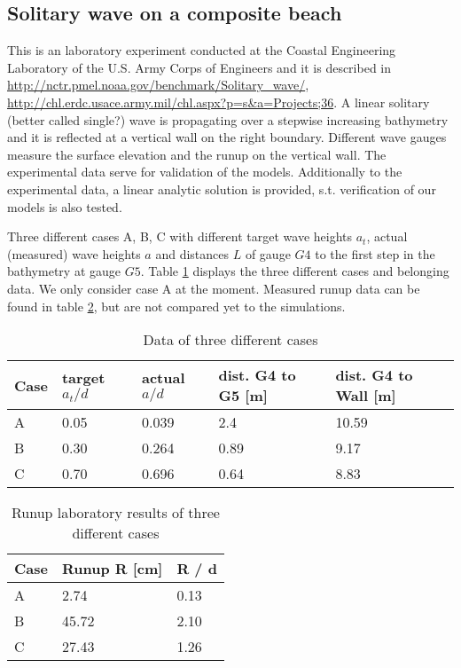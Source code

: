 \subsection{Solitary wave on a composite beach}
This is an laboratory experiment conducted at the Coastal Engineering Laboratory of the U.S. Army Corps of Engineers and it is described in \url{http://nctr.pmel.noaa.gov/benchmark/Solitary_wave/}, \url{http://chl.erdc.usace.army.mil/chl.aspx?p=s&a=Projects;36}. 
A linear solitary (better called single?) wave is propagating over a stepwise increasing bathymetry and it is reflected at a vertical wall on the right boundary. Different wave gauges measure the surface elevation and the runup on the vertical wall. 
The experimental data serve for validation of the models. Additionally to the experimental data, a linear analytic solution is provided, s.t. verification of our models is also tested.

Three different cases A, B, C with different target wave heights $a_t$, actual (measured) wave heights $a$ and distances $L$ of gauge $G4$ to the first step in the bathymetry at gauge $G5$. Table \ref{tab:compositebeach_cases} displays the three different cases and belonging data. We only consider case A at the moment. Measured runup data can be found in table \ref{tab:compositebeach_runup}, but are not compared yet to the simulations.

\begin{table}[htbp]
\begin{tabular}{lllll}
\textbf{Case} & \textbf{target $a_t / d$} & \textbf{actual $a / d$} & \textbf{dist. G4 to G5 [m]} & \textbf{dist. G4 to Wall [m]}  \\
\toprule
A       &     0.05   & 0.039    &   2.4   &  10.59     \\
B       &     0.30   & 0.264    &   0.89  &   9.17     \\
C       &     0.70   & 0.696    &    0.64  &   8.83    \\
\bottomrule
\end{tabular}
\caption{Data of three different cases}
\label{tab:compositebeach_cases}
\end{table}


\begin{table}[htbp]
\begin{tabular}{lll}
\textbf{Case} & \textbf{Runup R [cm]} & \textbf{R / d} \\
\toprule
A       &        2.74  &  0.13 \\
B       &       45.72  &  2.10 \\
C       &       27.43  &  1.26 \\
\bottomrule
\end{tabular}
\caption{Runup laboratory results of three different cases}
\label{tab:compositebeach_runup}
\end{table}


